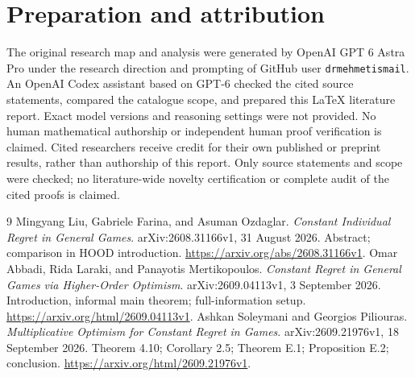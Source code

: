 \documentclass[11pt]{article}
\begin{document}
\section*{Preparation and attribution}
The original research map and analysis were generated by OpenAI GPT 6
Astra Pro under the research direction and prompting of GitHub user
\texttt{drmehmetismail}. An OpenAI Codex assistant based on GPT-6 checked
the cited source statements, compared the catalogue scope, and prepared
this LaTeX literature report. Exact model versions and reasoning settings
were not provided. No human mathematical authorship or independent human
proof verification is claimed. Cited researchers receive credit for their
own published or preprint results, rather than authorship of this report.
Only source statements and scope were checked; no literature-wide novelty
certification or complete audit of the cited proofs is claimed.
\begin{thebibliography}{9}
Mingyang Liu, Gabriele Farina, and Asuman Ozdaglar.
\emph{Constant Individual Regret in General Games}.
arXiv:2608.31166v1, 31 August 2026.
Abstract; comparison in HOOD introduction.
\url{https://arxiv.org/abs/2608.31166v1}.
Omar Abbadi, Rida Laraki, and Panayotis Mertikopoulos.
\emph{Constant Regret in General Games via Higher-Order Optimism}.
arXiv:2609.04113v1, 3 September 2026.
Introduction, informal main theorem; full-information setup.
\url{https://arxiv.org/html/2609.04113v1}.
Ashkan Soleymani and Georgios Piliouras.
\emph{Multiplicative Optimism for Constant Regret in Games}.
arXiv:2609.21976v1, 18 September 2026.
Theorem 4.10; Corollary 2.5; Theorem E.1; Proposition E.2; conclusion.
\url{https://arxiv.org/html/2609.21976v1}.
\end{thebibliography}
\end{document}
